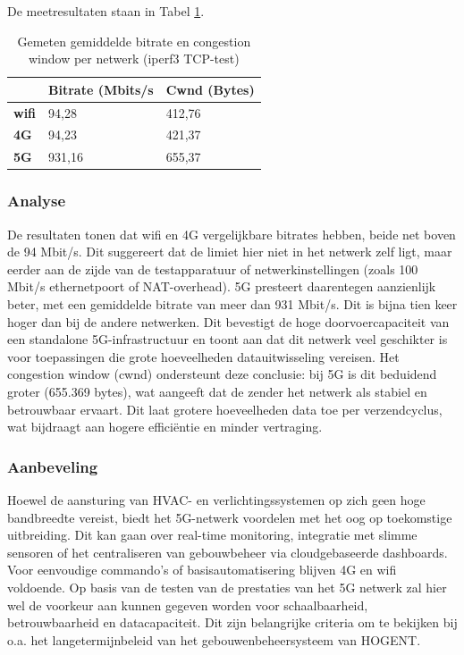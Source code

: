 De meetresultaten staan in Tabel \ref{tab:bandbreedte}.

\begin{table}[]
    \caption{Gemeten gemiddelde bitrate en congestion window per netwerk (iperf3 TCP-test)}
    \begin{tabular}{l l l}
        \cline{2-3}
        & \textbf{Bitrate (Mbits/s} & \textbf{Cwnd (Bytes)} \\ \hline
        \multicolumn{1}{l}{\textbf{wifi}} & 94,28                    & 412,76              \\ \hline
        \multicolumn{1}{l}{\textbf{4G}}   & 94,23                      & 421,37              \\ \hline
        \multicolumn{1}{l}{\textbf{5G}}   & 931,16                    & 655,37              \\ \hline
    \end{tabular}
    
    \label{tab:bandbreedte}
\end{table}

\subsubsection{Analyse}
De resultaten tonen dat wifi en 4G vergelijkbare bitrates hebben, beide net boven de 94 Mbit/s. Dit suggereert dat de limiet hier niet in het netwerk zelf ligt, maar eerder aan de zijde van de testapparatuur of netwerkinstellingen (zoals 100 Mbit/s ethernetpoort of NAT-overhead).
5G presteert daarentegen aanzienlijk beter, met een gemiddelde bitrate van meer dan 931 Mbit/s. Dit is bijna tien keer hoger dan bij de andere netwerken. Dit bevestigt de hoge doorvoercapaciteit van een standalone 5G-infrastructuur en toont aan dat dit netwerk veel geschikter is voor toepassingen die grote hoeveelheden datauitwisseling vereisen.
Het congestion window (cwnd) ondersteunt deze conclusie: bij 5G is dit beduidend groter (655.369 bytes), wat aangeeft dat de zender het netwerk als stabiel en betrouwbaar ervaart. Dit laat grotere hoeveelheden data toe per verzendcyclus, wat bijdraagt aan hogere efficiëntie en minder vertraging.

\subsubsection{Aanbeveling}
Hoewel de aansturing van HVAC- en verlichtingssystemen op zich geen hoge bandbreedte vereist, biedt het 5G-netwerk voordelen met het oog op toekomstige uitbreiding. Dit kan gaan over real-time monitoring, integratie met slimme sensoren of het centraliseren van gebouwbeheer via cloudgebaseerde dashboards.
Voor eenvoudige commando’s of basisautomatisering blijven 4G en wifi voldoende. Op basis van de testen van de prestaties van het 5G netwerk zal hier wel de voorkeur aan kunnen gegeven worden voor schaalbaarheid, betrouwbaarheid en datacapaciteit. Dit zijn belangrijke criteria om te bekijken bij o.a. het langetermijnbeleid van het gebouwenbeheersysteem van HOGENT.



